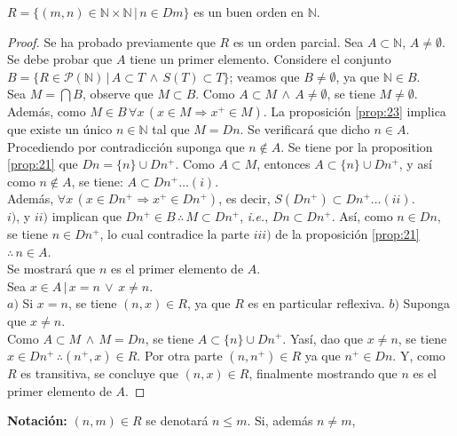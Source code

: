 \begin{proposition}\label{prop:24} $R = \{(m,n) \in \mathbb{N} \times
    \mathbb{N} \, | \, n \in Dm \}$ es un buen orden en $\mathbb{N}$.
\end{proposition}
\begin{proof}
    Se ha probado previamente que $R$ es un orden parcial. Sea $A \subset
    \mathbb{N}$, $A \neq \emptyset$. Se debe probar que $A$ tiene un primer
    elemento. Considere el conjunto $B = \{ R \in \mathcal{P}(\mathbb{N}) \, |
    \, A \subset T \, \land \, S(T) \subset T \}$; veamos que $B \neq
    \emptyset$, ya que $ \mathbb{N} \in B$. \\
    Sea $M = \bigcap B$, observe que $M \subset B$. Como $A \subset M \, \land
    \, A \neq \emptyset$, se tiene $M \neq \emptyset$. Además, como $M \in B \,
    \forall x \, ( x \in M \Rightarrow x^+ \in M)$. La proposición \ref{prop:23}
    implica que existe un único $n \in \mathbb{N}$ tal que $M = Dn$. Se
    verificará que dicho $n \in A$. Procediendo por contradicción suponga que
    $n \notin A$. Se tiene por la proposition \ref{prop:21} que $Dn = \{n\} \cup
    Dn^+$. Como $A \subset M$, entonces $A \subset \{n\} \cup Dn^+$, y así como
    $n \notin A$, se tiene: $A \subset Dn^+ \ldots (i)$.\\
    Además, $\forall x \, (x \in Dn^+ \Rightarrow x^+ \in Dn^+)$, es decir,
    $S(Dn^+)\subset Dn^+ \ldots (ii)$. \\
    $i)$, y $ii)$ implican que $Dn^+ \in B \, \therefore \, M \subset Dn^+$,
    \textit{i.e.}, $Dn \subset Dn^+$. Así, como $n \in Dn$, se tiene $n\in Dn^+$, lo cual
    contradice la parte $iii)$ de la proposición \ref{prop:21} $\therefore \, n
    \in A$.\\
    Se mostrará que $n$ es el primer elemento de $A$.\\
    Sea $x \in A \, | \, x=n \, \lor \, x\neq n$.\\
    $a)$ Si $x=n$, se tiene $(n,x) \in R$, ya que $R$ es en particular
    reflexiva.
    $b)$ Suponga que $x \neq n$. \\
    Como $A\subset M \, \land \, M=Dn$, se tiene $A\subset\{n\}\cup Dn^+$. Yasí,
    dao que $x\neq n$, se tiene $x \in Dn^+\, \therefore (n^+,x)\in R$. Por otra
    parte $(n,n^+)\in R$ ya que $n^+ \in Dn$. Y, como $R$ es transitiva, se
    concluye que $(n,x)\in R$, finalmente mostrando que $n$ es el primer
    elemento de $A$.
\end{proof}
\textbf{Notación:} $(n,m)\in R$ se denotará $n \leq m$. Si, además $n \neq m$,
